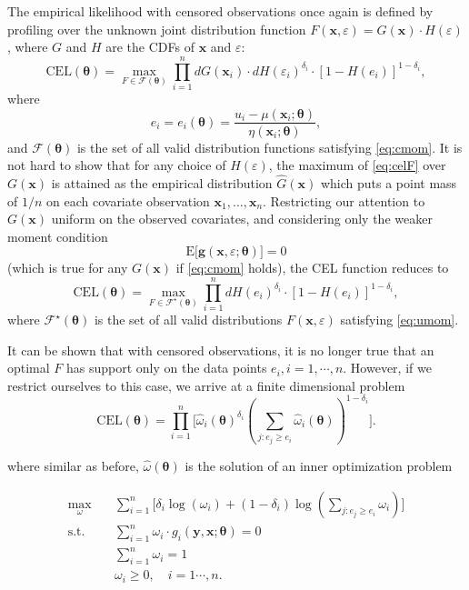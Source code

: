 \documentclass[article]{jss}
\newcommand{\xx}{\bm x}
\newcommand{\yy}{\bm y}
\newcommand{\tth}{\bm \theta}
\renewcommand{\gg}{\bm g}
\newcommand{\w}{\omega}
\renewcommand{\E}{\textrm{E}}
\newcommand{\CEL}{\textrm{CEL}}
\newcommand{\e}{\varepsilon}
\renewcommand{\|}{\,|\,}
\begin{document}
The empirical likelihood with censored observations once again is defined by profiling over the unknown joint distribution function \(F(\xx,\e) = G(\xx) \cdot H(\e)\), where \(G\) and \(H\) are the CDFs of \(\xx\) and \(\e\):
\begin{equation}\label{eq:celF}
  \CEL(\tth) = \max_{F \in \mathcal F(\tth)}\prod_{i=1}^n dG(\xx_i) \cdot dH(\e_i)^{\delta_i} \cdot [1- H(e_i)]^{1-\delta_i},
\end{equation}
where
\[
  e_i = e_i(\tth) = \frac{u_i - \mu(\xx_i;\tth)}{\eta(\xx_i;\tth)},
\]
and \(\mathcal F(\tth)\) is the set of all valid distribution functions satisfying \eqref{eq:cmom}. It is not hard to show that for any choice of \(H(\e)\), the maximum of \eqref{eq:celF} over \(G(\xx)\) is attained as the empirical distribution \(\hat G(\xx)\) which puts a point mass of \(1/n\) on each covariate observation \(\xx_1, \ldots, \xx_n\). Restricting our attention to \(G(\xx)\) uniform on the observed covariates, and considering only the weaker moment condition
\begin{equation}\label{eq:umom}
  \E\bigl[\gg(\xx, \e; \tth)\bigr] = 0
\end{equation}
(which is true for any \(G(\xx)\) if \eqref{eq:cmom} holds), the CEL function reduces to
\[
  \CEL(\tth) = \max_{F \in \mathcal F^\star(\tth)}\prod_{i=1}^n dH(e_i)^{\delta_i} \cdot [1- H(e_i)]^{1-\delta_i},
\]
where \(\mathcal F^\star(\tth)\) is the set of all valid distributions \(F(\xx, \e)\) satisfying \eqref{eq:umom}.

It can be shown that with censored observations, it is no longer true that an optimal \(F\) has support only on the data points \(e_i, i=1,\cdots,n\). However, if we restrict ourselves to this case, we arrive at a finite dimensional problem
\begin{equation} \label{eq:elcens}
  \CEL(\tth) = \prod_{i=1}^n \Big[\hat \w_i(\tth)^{\delta_i}(\sum_{j: e_j \geq e_i}\hat \w_i(\tth))^{1-\delta_i}\Big].
\end{equation}

where similar as before, \(\hat\w(\tth)\) is the solution of an inner optimization problem

\begin{equation} \label{eq:elcens_inner}
\begin{split}
  \max_{\w}\quad & \sum_{i=1}^n \Big[\delta_i\log(\w_i) + (1-\delta_i)\log(\sum_{j: e_j\geq e_i}\w_i)\Big]\\
  \text{s.t.}\quad & \sum_{i=1}^n \w_i\cdot g_i(\yy,\xx;\tth) = 0 \\
  & \sum_{i=1}^n \w_i = 1 \\
  & \w_i \geq 0, \quad i=1\cdots,n.
\end{split}
\end{equation}
\end{document}

